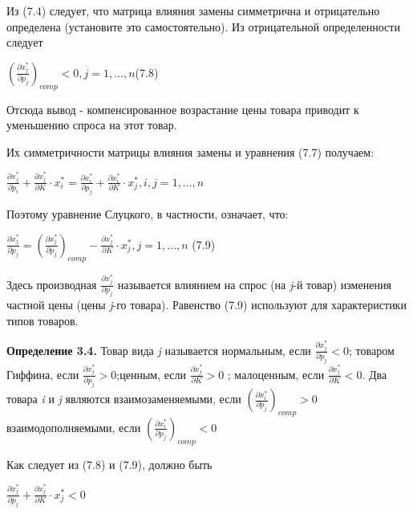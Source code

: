\documentclass[12pt, 4paper]{book}
\begin{document}
{Из (7.4) следует, что матрица влияния замены симметрична и отрицательно определена (установите это самостоятельно). Из отрицательной определенности следует 
\begin{center}
$(\frac{\partial x_{j}^{*}}{\partial p_j})_{comp} < 0,j=1,...,n$(7.8)
\end{center}
\par

Отсюда вывод - компенсированное возрастание цены товара приводит к уменьшению спроса на этот товар. 
\par

Их симметричности матрицы влияния замены и уравнения (7.7) получаем: 
\begin{center}
$\frac{\partial x_{j}^{*}}{\partial p_i}+\frac{\partial x_{j}^{*}}{\partial K}\cdot x_{i}^{*} = \frac{\partial x_{i}^{*}}{\partial p_j}+\frac{\partial x_{i}^{*}}{\partial K}\cdot x_{j}^{*},i,j=1,...,n$
\end{center}
Поэтому уравнение Слуцкого, в частности, означает, что: 
\begin{center}
$\frac{\partial x_{j}^{*}}{\partial p_j}=(\frac{\partial x_{j}^{*}}{\partial p_j})_{comp} - \frac{\partial x_{j}^{*}}{\partial K}\cdot x_{j}^{*},j=1,...,n$ (7.9)
\end{center}
\par

Здесь производная $\frac{\partial x_{j}^{*}}{\partial p_j}$ называется влиянием на спрос (на \textit{j}-й товар) изменения частной цены (цены \textit{j}-го товара). Равенство (7.9) используют для характеристики типов товаров. 
\par

\textbf{Определение 3.4.} Товар вида \textit{j} называется нормальным, если $\frac{\partial x_{j}^{*}}{\partial p_j} < 0$;
товаром Гиффина, если $\frac{\partial x_{j}^{*}}{\partial p_j} > 0$;ценным, если $\frac{\partial x_{j}^{*}}{\partial K} > 0$ ; малоценным, если $\frac{\partial x_{j}^{*}}{\partial K} < 0$. Два товара \textit{i} и \textit{j} являются взаимозаменяемыми, если   $(\frac{\partial x_{i}^{*}}{\partial p_j})_{comp} > 0$ взаимодополняемыми, если $(\frac{\partial x_{i}^{*}}{\partial p_j})_{comp} < 0$
\par

Как следует из (7.8) и (7.9), должно быть 
\begin{center}
$\frac{\partial x_{j}^{*}}{\partial p_j}+\frac{\partial x_{j}^{*}}{\partial K}\cdot x_{j}^{*} < 0 $
\end{center}
\par

}
\end{document}
